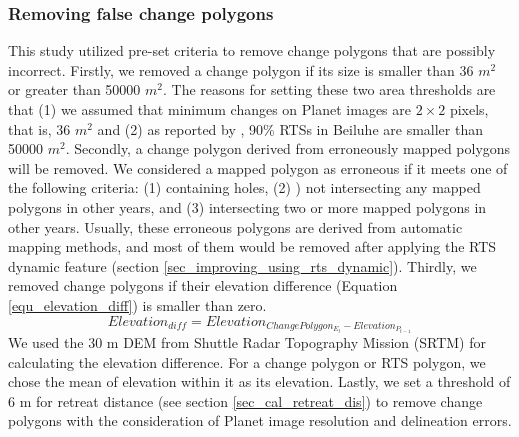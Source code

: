 \documentclass[authoryear,preprint,review,12pt]{elsarticle}
\begin{document}
\subsubsection{Removing false change polygons}
\label{sec_removing_false_change}

This study utilized pre-set criteria to remove change polygons that are possibly incorrect. 
Firstly, we removed a change polygon if its size is smaller than 36 $m^2$ or greater than 50000 $m^2$. 
The reasons for setting these two area thresholds are that (1) we assumed that minimum changes on Planet images are $2\times2$ pixels, that is, 36 $m^2$ and (2) as reported by \cite{huang2020using}, 90\% RTSs in Beiluhe are smaller than 50000 $m^2$. 
Secondly, a change polygon derived from erroneously mapped polygons will be removed.
We considered a mapped polygon as erroneous if it meets one of the following criteria: (1) containing holes, (2) ) not intersecting any mapped polygons in other years, and (3) intersecting two or more mapped polygons in other years.
Usually, these erroneous polygons are derived from automatic mapping methods, and most of them would be removed after applying the RTS dynamic feature (section \ref{sec_improving_using_rts_dynamic}). 
Thirdly, we removed change polygons if their elevation difference (Equation \ref{equ_elevation_diff}) is smaller than zero. 
\begin{equation}
Elevation_{diff}=Elevation_{ChangePolygon_{E_{t}} -  Elevation_{P_{t-1}}}
\label{equ_elevation_diff}
\end{equation}
We used the 30 m DEM from Shuttle Radar Topography Mission (SRTM) \citep{farr2007shuttle} for calculating the elevation difference. 
For a change polygon or RTS polygon, we chose the mean of elevation within it as its elevation. 
Lastly, we set a threshold of 6 m for retreat distance (see section \ref{sec_cal_retreat_dis}) to remove change polygons with the consideration of Planet image resolution and delineation errors. 
\end{document}
